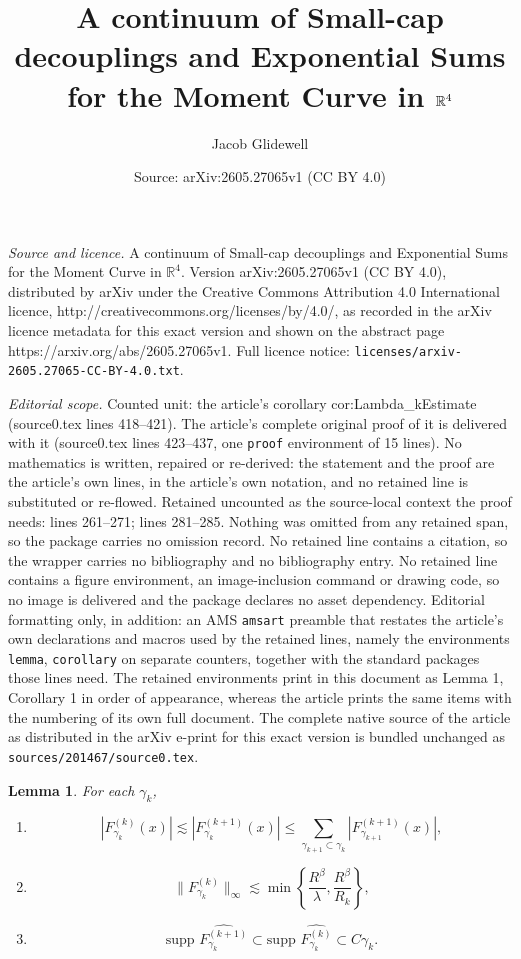 \documentclass[10pt,a4paper]{amsart}
\title{A continuum of Small-cap decouplings and Exponential Sums for the Moment Curve in $\R^4$}
\author{Jacob Glidewell}
\date{Source: arXiv:2605.27065v1 (CC BY 4.0)}
\providecommand{\R}{\mathbb R}
\newtheorem{lemma}{Lemma}
\providecommand{\wh}{\widehat}
\begin{document}
\maketitle

\noindent\emph{Source and licence.} A continuum of Small-cap decouplings and Exponential Sums for the Moment Curve in $\R^4$. Version arXiv:2605.27065v1 (CC BY 4.0), distributed by arXiv under the Creative Commons Attribution 4.0 International licence, http://creativecommons.org/licenses/by/4.0/, as recorded in the arXiv licence metadata for this exact version and shown on the abstract page https://arxiv.org/abs/2605.27065v1. Full licence notice: \texttt{licenses/arxiv-2605.27065-CC-BY-4.0.txt}.\par\smallskip

\noindent\textit{Editorial scope.} Counted unit: the article's corollary cor:Lambda\_kEstimate (source0.tex lines 418--421). The article's complete original proof of it is delivered with it (source0.tex lines 423--437, one \texttt{proof} environment of 15 lines). No mathematics is written, repaired or re-derived: the statement and the proof are the article's own lines, in the article's own notation, and no retained line is substituted or re-flowed.  Retained uncounted as the source-local context the proof needs: lines 261--271; lines 281--285.  Nothing was omitted from any retained span, so the package carries no omission record.  No retained line contains a citation, so the wrapper carries no bibliography and no bibliography entry.  No retained line contains a figure environment, an image-inclusion command or drawing code, so no image is delivered and the package declares no asset dependency.  Editorial formatting only, in addition: an AMS \texttt{amsart} preamble that restates the article's own declarations and macros used by the retained lines, namely the environments \texttt{lemma}, \texttt{corollary} on separate counters, together with the standard packages those lines need.  The retained environments print in this document as Lemma 1, Corollary 1 in order of appearance, whereas the article prints the same items with the numbering of its own full document.  The complete native source of the article as distributed in the arXiv e-print for this exact version is bundled unchanged as \texttt{sources/201467/source0.tex}.
\begin{lemma}\label{lem:PruningProperties}
For each $\gamma_k$,
    \begin{enumerate}
        \item[a)] 
        $$|F^{(k)}_{\gamma_k}(x)|\lesssim |F^{(k+1)}_{\gamma_k}(x)|\le \sum_{\gamma_{k+1}\subset \gamma_k}|F_{\gamma_{k+1}}^{(k+1)}(x)|,$$

        \item[b)]  $$\|F_{\gamma_k}^{(k)}\|_\infty \lesssim \min \left\{\frac{R^{\beta}}{\lambda}, \frac{R^\beta}{R_k}\right\},$$

        \item[c)] $$\text{supp }\wh{F_{\gamma_k}^{(k+1)}}\subset \text{supp }\wh{F_{\gamma_k}^{(k)}}\subset C \gamma_k.$$
    \end{enumerate}
\end{lemma}
\end{document}
